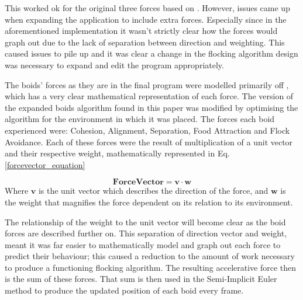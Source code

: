 This worked ok for the original three forces based on \citet{Reynolds:1987:FHS:37402.37406}. However, issues came up when expanding the application to include extra forces. Especially since in the aforementioned implementation it wasn't strictly clear how the forces would graph out due to the lack of separation between direction and weighting. This caused issues to pile up and it was clear a change in the flocking algorithm design was necessary to expand and edit the program appropriately.

The boids' forces as they are in the final program were modelled primarily off \citet{4604156}, which has a very clear mathematical representation of each force. The version of the expanded boids algorithm found in this paper was modified by optimising the algorithm for the environment in which it was placed. The forces each boid experienced were: Cohesion, Alignment, Separation, Food Attraction and Flock Avoidance. Each of these forces were the result of multiplication of a unit vector and their respective weight, mathematically represented in Eq.\ref{forcevector_equation}

\begin{equation}
\boldsymbol{Force Vector} = \boldsymbol{v} \cdot \boldsymbol{w}
\label{forcevector_equation}
\end{equation}
Where $\boldsymbol{v}$ is the unit vector which describes the direction of the force, and $\boldsymbol{w}$ is the weight that magnifies the force dependent on its relation to its environment.

The relationship of the weight to the unit vector will become clear as the boid forces are described further on. This separation of direction vector and weight, meant it was far easier to mathematically model and graph out each force to predict their behaviour; this caused a reduction to the amount of work necessary to produce a functioning flocking algorithm. The resulting accelerative force then is the sum of these forces. That sum is then used in the Semi-Implicit Euler method to produce the updated position of each boid every frame.



